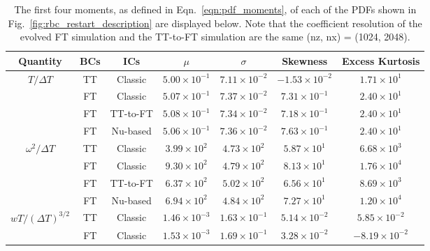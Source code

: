 \documentclass[aps, pre, onecolumn, nofootinbib, notitlepage, groupedaddress, amsfonts, amssymb, amsmath, longbibliography, superscriptaddress]{revtex4-1}
\newcommand{\ea}[1]{{\color{red} #1}}
\begin{document}
\begin{table}[b!]
\vspace{-0.5cm}
\caption{ 
	The first four moments, as defined in Eqn.~\ref{eqn:pdf_moments}, of each of the PDFs shown in Fig.~\ref{fig:rbc_restart_description} are displayed below.
	\ea{Note that the coefficient resolution of the evolved FT simulation and the TT-to-FT simulation are the same (nz, nx) = (1024, 2048).}
}
\vspace{-0.25cm}
\setlength{\tabcolsep}{12pt}
\label{table:pdf_values}
\begin{center}
\begin{tabular}{c c c c c c c}
\hline																	
Quantity 				&	BCs	& ICs	    &	$\mu$					&	$\sigma$				&	Skewness	&	Excess Kurtosis \\
\hline
$T/\Delta T$			&	TT	& Classic	&	$5.00 \times 10^{-1}$	&	$7.11 \times 10^{-2}$	&	$-1.53 \times 10^{-2}$	&	$1.71 \times 10^{1}$ \\
						&	FT	& Classic	&	$5.07 \times 10^{-1}$	&	$7.37 \times 10^{-2}$	&	$7.31 \times 10^{-1}$	&	$2.40 \times 10^{1}$ \\
						&	FT	& TT-to-FT	&	$5.08 \times 10^{-1}$	&	$7.34 \times 10^{-2}$	&	$7.18 \times 10^{-1}$	&	$2.40 \times 10^{1}$ \\
						&	FT	& Nu-based	&	$5.06 \times 10^{-1}$	&	$7.36 \times 10^{-2}$	&	$7.63 \times 10^{-1}$	&	$2.40 \times 10^{1}$ \\
\hline                                                                                                                      
$\omega^2/\Delta T$		&	TT	& Classic	&	$3.99 \times 10^{2}$	&	$4.73 \times 10^{2}$	&	$5.87 \times 10^{1}$	&	$6.68 \times 10^{3}$ \\
						&	FT	& Classic	&	$9.30 \times 10^{2}$	&	$4.79 \times 10^{2}$	&	$8.13 \times 10^{1}$	&	$1.76 \times 10^{4}$ \\
						&	FT	& TT-to-FT	&	$6.37 \times 10^{2}$	&	$5.02 \times 10^{2}$	&	$6.56 \times 10^{1}$	&	$8.69 \times 10^{3}$ \\
						&	FT	& Nu-based	&	$6.94 \times 10^{2}$	&	$4.84 \times 10^{2}$	&	$7.27 \times 10^{1}$	&	$1.20 \times 10^{4}$ \\
\hline                                                                                                                      
$wT/(\Delta T)^{3/2}$	&	TT	& Classic	&	$1.46 \times 10^{-3}$	&	$1.63 \times 10^{-1}$	&	$5.14 \times 10^{-2}$	&	$5.85  \times 10^{-2}$ \\
						&	FT	& Classic	&	$1.53 \times 10^{-3}$	&	$1.69 \times 10^{-1}$	&	$3.28 \times 10^{-2}$	&	$-8.19 \times 10^{-2}$ \\

\end{tabular}
\end{center}
\end{table}
\end{document}

